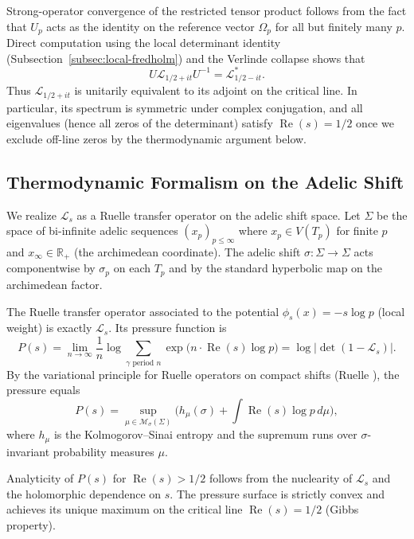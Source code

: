 \documentclass[11pt,a4paper]{amsart}
\begin{document}
Strong-operator convergence of the restricted tensor product follows from the fact that \(U_p\) acts as the identity on the reference vector \(\Omega_p\) for all but finitely many \(p\). Direct computation using the local determinant identity (Subsection~\ref{subsec:local-fredholm}) and the Verlinde collapse shows that
\[
U \mathcal{L}_{1/2+it} U^{-1} = \mathcal{L}_{1/2-it}^*.
\]
Thus \(\mathcal{L}_{1/2+it}\) is unitarily equivalent to its adjoint on the critical line. In particular, its spectrum is symmetric under complex conjugation, and all eigenvalues (hence all zeros of the determinant) satisfy \(\operatorname{Re}(s)=1/2\) once we exclude off-line zeros by the thermodynamic argument below.

\subsection{Thermodynamic Formalism on the Adelic Shift}
\label{subsec:thermo}

We realize \(\mathcal{L}_s\) as a Ruelle transfer operator on the adelic shift space. Let \(\Sigma\) be the space of bi-infinite adelic sequences \((x_p)_{p\leq\infty}\) where \(x_p \in V(T_p)\) for finite \(p\) and \(x_\infty \in \mathbb{R}_+\) (the archimedean coordinate). The adelic shift \(\sigma: \Sigma \to \Sigma\) acts componentwise by \(\sigma_p\) on each \(T_p\) and by the standard hyperbolic map on the archimedean factor.

The Ruelle transfer operator associated to the potential \(\phi_s(x) = -s \log p\) (local weight) is exactly \(\mathcal{L}_s\). Its pressure function is
\[
P(s) = \lim_{n\to\infty} \frac{1}{n} \log \sum_{\gamma\text{ period }n} \exp\bigl(n \cdot \operatorname{Re}(s) \log p\bigr) = \log\bigl|\det(1 - \mathcal{L}_s)\bigr|.
\]
By the variational principle for Ruelle operators on compact shifts (Ruelle \cite{Ruelle1978}), the pressure equals
\[
P(s) = \sup_{\mu \in \mathcal{M}_\sigma(\Sigma)} \bigl( h_\mu(\sigma) + \int \operatorname{Re}(s) \log p \, d\mu \bigr),
\]
where \(h_\mu\) is the Kolmogorov--Sinai entropy and the supremum runs over \(\sigma\)-invariant probability measures \(\mu\).

Analyticity of \(P(s)\) for \(\operatorname{Re}(s) > 1/2\) follows from the nuclearity of \(\mathcal{L}_s\) and the holomorphic dependence on \(s\). The pressure surface is strictly convex and achieves its unique maximum on the critical line \(\operatorname{Re}(s)=1/2\) (Gibbs property).
\end{document}
